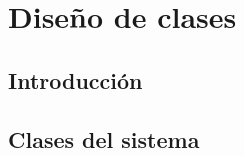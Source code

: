 
\chapter{Diseño de clases} \label{cap:diseño_clases}

\section{Introducción}









\section{Clases del sistema}


 

